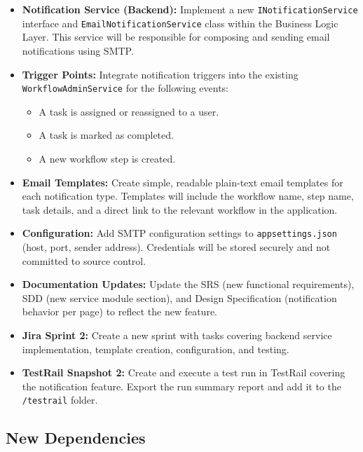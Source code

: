 \documentclass[12pt]{article}
\begin{document}
\begin{itemize}
    \item \textbf{Notification Service (Backend):} Implement a new
    \texttt{INotificationService} interface and \texttt{EmailNotificationService} class
    within the Business Logic Layer. This service will be responsible for composing and
    sending email notifications using SMTP.

    \item \textbf{Trigger Points:} Integrate notification triggers into the existing
    \texttt{WorkflowAdminService} for the following events:
    \begin{itemize}
        \item A task is assigned or reassigned to a user.
        \item A task is marked as completed.
        \item A new workflow step is created.
    \end{itemize}

    \item \textbf{Email Templates:} Create simple, readable plain-text email templates for
    each notification type. Templates will include the workflow name, step name, task
    details, and a direct link to the relevant workflow in the application.

    \item \textbf{Configuration:} Add SMTP configuration settings to
    \texttt{appsettings.json} (host, port, sender address). Credentials will be stored
    securely and not committed to source control.

    \item \textbf{Documentation Updates:} Update the SRS (new functional requirements),
    SDD (new service module section), and Design Specification (notification behavior per
    page) to reflect the new feature.

    \item \textbf{Jira Sprint 2:} Create a new sprint with tasks covering backend service
    implementation, template creation, configuration, and testing.

    \item \textbf{TestRail Snapshot 2:} Create and execute a test run in TestRail covering
    the notification feature. Export the run summary report and add it to the
    \texttt{/testrail} folder.
\end{itemize}

\subsection{New Dependencies}
\end{document}
